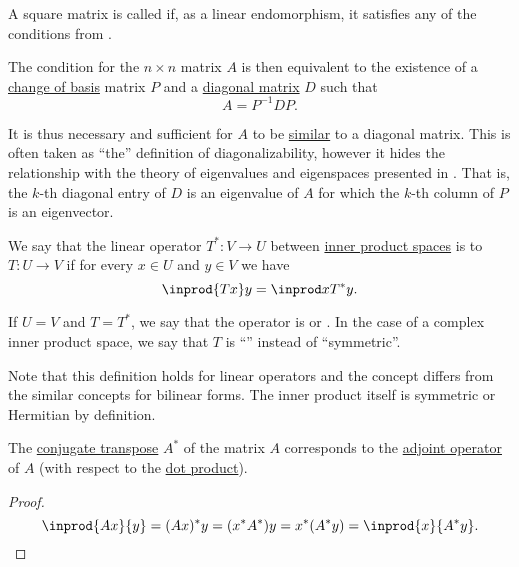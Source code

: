 \begin{definition}\label{def:diagonalizable_matrix}\mimprovised
  A square matrix is called  if, as a linear endomorphism, it satisfies any of the conditions from .

  The condition  for the \( n \times n \) matrix \( A \) is then equivalent to the existence of a \hyperref[rem:change_of_basis]{change of basis} matrix \( P \) and a \hyperref[def:matrix_diagonal]{diagonal matrix} \( D \) such that
  \begin{equation*}
    A = P^{-1} D P.
  \end{equation*}

  It is thus necessary and sufficient for \( A \) to be \hyperref[def:similar_matrices]{similar} to a diagonal matrix. This is often taken as \enquote{the} definition of diagonalizability, however it hides the relationship with the theory of eigenvalues and eigenspaces presented in . That is, the \( k \)-th diagonal entry of \( D \) is an eigenvalue of \( A \) for which the \( k \)-th column of \( P \) is an eigenvector.
\end{definition}

\begin{definition}\label{def:adjoint_operator}
  We say that the linear operator \( T^*: V \to U \) between \hyperref[def:inner_product_space]{inner product spaces} is  to \( T: U \to V \) if for every \( x \in U \) and \( y \in V \) we have
  \begin{equation*}
    \inprod {Tx} y = \inprod x {T^* y}.
  \end{equation*}

  If \( U = V \) and \( T = T^* \), we say that the operator is  or . In the case of a complex inner product space, we say that \( T \) is \enquote{} instead of \enquote{symmetric}.

  Note that this definition holds for linear operators and the concept differs from the similar concepts for bilinear forms. The inner product itself is symmetric or Hermitian by definition.
\end{definition}

\begin{proposition}\label{thm:conjugate_transpose}
  The \hyperref[def:conjugate_transpose]{conjugate transpose} \( A^* \) of the matrix \( A \) corresponds to the \hyperref[def:adjoint_operator]{adjoint operator} of \( A \) (with respect to the \hyperref[def:inner_product_space]{dot product}).
\end{proposition}
\begin{proof}
  \begin{equation*}
    \inprod {Ax} {y}
    =
    (Ax)^* y
    =
    (x^* A^*) y
    =
    x^* (A^* y)
    =
    \inprod {x} {A^* y}.
  \end{equation*}
\end{proof}

